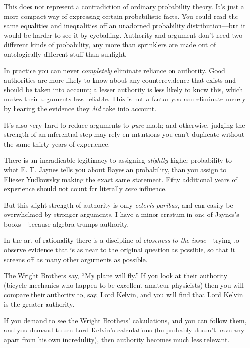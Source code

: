 \bigskip

{
 This does not represent a contradiction of ordinary probability
theory. It's just a more compact way of expressing
certain probabilistic facts. You could read the same equalities and
inequalities off an unadorned probability distribution---but it would
be harder to see it by eyeballing. Authority and argument
don't need two different kinds of probability, any more
than sprinklers are made out of ontologically different stuff than
sunlight. }

{
 In practice you can never \textit{completely} eliminate reliance
on authority. Good authorities are more likely to know about any
counterevidence that exists and should be taken into account; a lesser
authority is less likely to know this, which makes their arguments less
reliable. This is not a factor you can eliminate merely by hearing the
evidence they \textit{did} take into account.}

{
 It's also very hard to reduce arguments to
\textit{pure} math; and otherwise, judging the strength of an
inferential step may rely on intuitions you can't
duplicate without the same thirty years of experience.}

{
 There is an ineradicable legitimacy to assigning \textit{slightly}
higher probability to what E. T. Jaynes tells you about Bayesian
probability, than you assign to Eliezer Yudkowsky making the exact same
statement. Fifty additional years of experience should not count for
literally \textit{zero} influence.}

{
 But this slight strength of authority is only \textit{ceteris
paribus}, and can easily be overwhelmed by stronger arguments. I have a
minor erratum in one of Jaynes's books---because
algebra trumps authority.}

\myendsectiontext


\bigskip


{
 In the art of rationality there is a discipline of
\textit{closeness-to-the-issue}{}---trying to observe evidence that is
as near to the original question as possible, so that it screens off as
many other arguments as possible. }

{
 The Wright Brothers say, ``My plane will
fly.'' If you look at their authority (bicycle
mechanics who happen to be excellent amateur physicists) then you will
compare their authority to, say, Lord Kelvin, and you will find that
Lord Kelvin is the greater authority.}

{
 If you demand to see the Wright Brothers'
calculations, and you can follow them, and you demand to see Lord
Kelvin's calculations (he probably
doesn't have any apart from his own incredulity), then
authority becomes much less relevant.}


